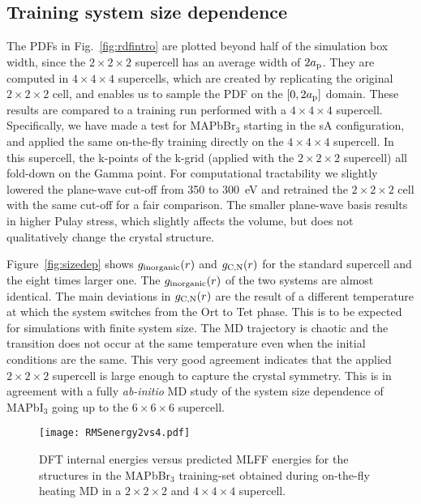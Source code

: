 \documentclass[journal=jpccck,manuscript=article,layout=twocolumn]{achemso}
\begin{document}
\subsection{Training system size dependence}
The PDFs in Fig.~\ref{fig:rdfintro} are plotted beyond half of the simulation box width, since the $2\times2\times2$ supercell has an average width of $2a_{\rm p}$. They are computed in $4\times4\times4$ supercells, which are created by replicating the original $2\times2\times2$ cell, and enables us to sample the PDF on the $[0,2a_{\rm p}]$ domain. These results are compared to a training run performed with a $4\times4\times4$ supercell. Specifically, we have made a test for MAPbBr$_3$ starting in the sA configuration, and applied the same on-the-fly training directly on the $4\times4\times4$ supercell. In this supercell, the k-points of the k-grid (applied with the $2\times2\times2$ supercell) all fold-down on the Gamma point. For computational tractability we slightly lowered the plane-wave cut-off from 350 to 300~eV and retrained the $2\times2\times2$ cell with the same cut-off for a fair comparison. The smaller plane-wave basis results in higher Pulay stress, which slightly affects the volume, but does not qualitatively change the crystal structure\cite{Lahnsteiner:prm18}.

Figure~\ref{fig:sizedep} shows $g_{\rm inorganic}(r)$ and $g_{\rm C,N}(r)$ for the standard supercell and the eight times larger one. The $g_{\rm inorganic}(r)$ of the two systems are almost identical. The main deviations in $g_{\rm C,N}(r)$ are the result of a different temperature at which the system switches from the Ort to Tet phase. This is to be expected for simulations with finite system size. The MD trajectory is chaotic and the transition does not occur at the same temperature even when the initial conditions are the same. This very good agreement indicates that the applied $2\times2\times2$ supercell is large enough to capture the crystal symmetry. This is in agreement with a fully \textit{ab-initio} MD study of the system size dependence of MAPbI$_3$ going up to the $6\times6\times6$ supercell\cite{Lahnsteiner:prb16}. 

\begin{figure}[!t]
    \begin{center}
    \texttt{[image: RMSenergy2vs4.pdf]}
    \end{center}
   \caption{DFT internal energies versus predicted MLFF energies for the structures in the MAPbBr$_3$ training-set obtained during on-the-fly heating MD in a $2\times2\times2$ and $4\times4\times4$ supercell.}
\label{fig:rms}
\end{figure}
\end{document}
